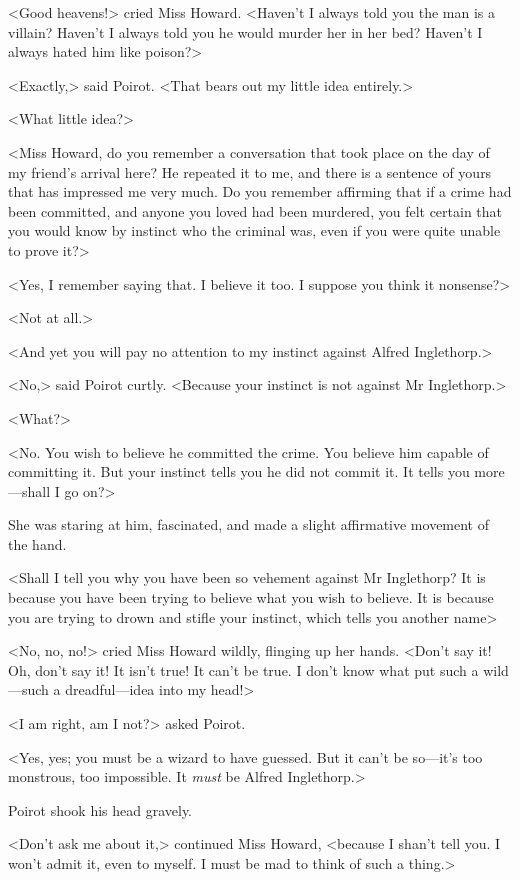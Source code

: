  <Good heavens!> cried Miss Howard. <Haven't I always told you the man is a villain? Haven't I always told you he would murder her in her bed? Haven't I always hated him like poison?> 

 <Exactly,> said Poirot. <That bears out my little idea entirely.> 

 <What little idea?> 

 <Miss Howard, do you remember a conversation that took place on the day of my friend's arrival here? He repeated it to me, and there is a sentence of yours that has impressed me very much. Do you remember affirming that if a crime had been committed, and anyone you loved had been murdered, you felt certain that you would know by instinct who the criminal was, even if you were quite unable to prove it?> 

 <Yes, I remember saying that. I believe it too. I suppose you think it nonsense?> 

 <Not at all.> 

 <And yet you will pay no attention to my instinct against Alfred Inglethorp.> 

 <No,> said Poirot curtly. <Because your instinct is not against Mr Inglethorp.> 

 <What?> 

 <No. You wish to believe he committed the crime. You believe him capable of committing it. But your instinct tells you he did not commit it. It tells you more—shall I go on?> 

 She was staring at him, fascinated, and made a slight affirmative movement of the hand. 

 <Shall I tell you why you have been so vehement against Mr Inglethorp? It is because you have been trying to believe what you wish to believe. It is because you are trying to drown and stifle your instinct, which tells you another name\longdash> 

 <No, no, no!> cried Miss Howard wildly, flinging up her hands. <Don't say it! Oh, don't say it! It isn't true! It can't be true. I don't know what put such a wild—such a dreadful—idea into my head!> 

 <I am right, am I not?> asked Poirot. 

 <Yes, yes; you must be a wizard to have guessed. But it can't be so—it's too monstrous, too impossible. It \emph{must} be Alfred Inglethorp.> 

 Poirot shook his head gravely. 

 <Don't ask me about it,> continued Miss Howard, <because I shan't tell you. I won't admit it, even to myself. I must be mad to think of such a thing.> 

